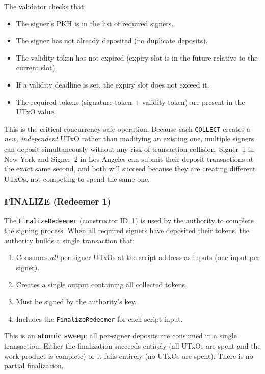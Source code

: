 The validator checks that:
\begin{itemize}[nosep]
  \item The signer's PKH is in the list of required signers.
  \item The signer has not already deposited (no duplicate deposits).
  \item The validity token has not expired (expiry slot is in the
    future relative to the current slot).
  \item If a validity deadline is set, the expiry slot does not exceed
    it.
  \item The required tokens (signature token + validity token) are
    present in the UTxO value.
\end{itemize}

This is the critical concurrency-safe operation. Because each
\texttt{COLLECT} creates a \emph{new, independent} UTxO rather than
modifying an existing one, multiple signers can deposit simultaneously
without any risk of transaction collision. Signer~1 in New York and
Signer~2 in Los Angeles can submit their deposit transactions at the
exact same second, and both will succeed because they are creating
different UTxOs, not competing to spend the same one.

\subsubsection{FINALIZE (Redeemer 1)}

The \texttt{FinalizeRedeemer} (constructor ID~1) is used by the
authority to complete the signing process. When all required signers
have deposited their tokens, the authority builds a single transaction
that:
\begin{enumerate}[nosep]
  \item Consumes \emph{all} per-signer UTxOs at the script address as
    inputs (one input per signer).
  \item Creates a single output containing all collected tokens.
  \item Must be signed by the authority's key.
  \item Includes the \texttt{FinalizeRedeemer} for each script input.
\end{enumerate}

This is an \textbf{atomic sweep}: all per-signer deposits are consumed
in a single transaction. Either the finalization succeeds entirely (all
UTxOs are spent and the work product is complete) or it fails entirely
(no UTxOs are spent). There is no partial finalization.

